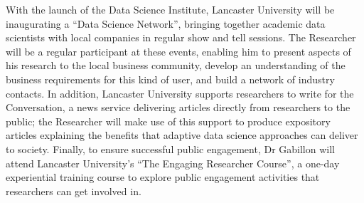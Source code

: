 \documentclass[a4paper,11pt]{article}
\newcommand{\TODO}[1]{{\textcolor{red}{[\textbf{TODO:} #1]}}}
\begin{document}
{\em 
{}

}

With the launch of the Data Science Institute, Lancaster University will be inaugurating a ``Data Science Network'', bringing together academic data scientists with local companies in regular show and tell sessions.  The Researcher will be a regular participant at these events, enabling him to present aspects of his research to the local business community, develop an understanding of the business requirements for this kind of user, and build a network of industry contacts.  In addition, Lancaster University supports researchers to write for the Conversation, a news  service delivering articles directly from researchers to the public; the Researcher will make use of this support to produce expository articles explaining the benefits that adaptive data science approaches can deliver to society.
Finally, to ensure successful public engagement, Dr Gabillon will attend Lancaster University's ``The Engaging Researcher Course'', a one-day experiential training course to explore public engagement activities that researchers can get involved in.
\end{document}
